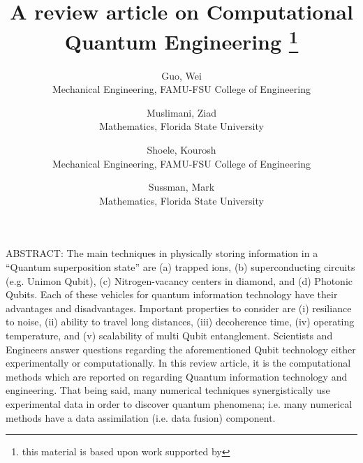 \documentclass[]{article}
\title{A review article on Computational Quantum Engineering
  \thanks{this material is based upon work supported by }}
\author{
  Guo, Wei \\
  Mechanical Engineering, FAMU-FSU College of Engineering
  \and
  Muslimani, Ziad \\
  Mathematics, Florida State University
  \and
  Shoele, Kourosh \\
  Mechanical Engineering, FAMU-FSU College of Engineering
  \and
  Sussman, Mark \\
  Mathematics, Florida State University
}
\begin{document}
\maketitle

ABSTRACT:
The main techniques in physically storing information in a ``Quantum superposition state'' are (a) trapped ions, (b) superconducting circuits (e.g. Unimon Qubit), (c) Nitrogen-vacancy centers in diamond, and (d) Photonic Qubits.  Each of these vehicles for quantum information technology  have their advantages and disadvantages.  Important properties to consider are (i) resiliance to noise, (ii) ability to travel long distances, (iii) decoherence time, (iv) operating temperature, and (v) scalability of multi Qubit entanglement.  Scientists and Engineers answer questions regarding the aforementioned Qubit technology either experimentally or computationally.  In this review article, it is the computational methods which are reported on regarding Quantum information technology and engineering.  That being said, many numerical techniques synergistically use experimental data in order to discover quantum phenomena; i.e. many numerical methods have a data assimilation (i.e. data fusion) component.   

\linenumbers
\end{document}
